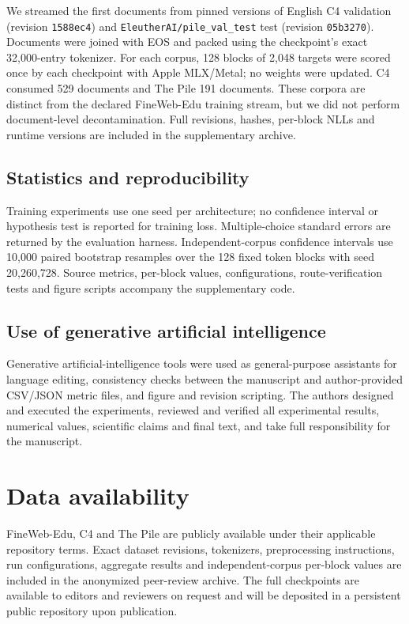 \documentclass[11pt]{article}
\begin{document}
We streamed the first documents from pinned versions of English C4 validation (revision \texttt{1588ec4}) and \texttt{EleutherAI/pile\_val\_test} test (revision \texttt{05b3270}). Documents were joined with EOS and packed using the checkpoint's exact 32,000-entry tokenizer. For each corpus, 128 blocks of 2,048 targets were scored once by each checkpoint with Apple MLX/Metal; no weights were updated. C4 consumed 529 documents and The Pile 191 documents. These corpora are distinct from the declared FineWeb-Edu training stream, but we did not perform document-level decontamination. Full revisions, hashes, per-block NLLs and runtime versions are included in the supplementary archive.

\subsection*{Statistics and reproducibility}

Training experiments use one seed per architecture; no confidence interval or hypothesis test is reported for training loss. Multiple-choice standard errors are returned by the evaluation harness. Independent-corpus confidence intervals use 10,000 paired bootstrap resamples over the 128 fixed token blocks with seed 20,260,728. Source metrics, per-block values, configurations, route-verification tests and figure scripts accompany the supplementary code.

\subsection*{Use of generative artificial intelligence}

Generative artificial-intelligence tools were used as general-purpose assistants for language editing, consistency checks between the manuscript and author-provided CSV/JSON metric files, and figure and revision scripting. The authors designed and executed the experiments, reviewed and verified all experimental results, numerical values, scientific claims and final text, and take full responsibility for the manuscript.

\section*{Data availability}

FineWeb-Edu, C4 and The Pile are publicly available under their applicable repository terms. Exact dataset revisions, tokenizers, preprocessing instructions, run configurations, aggregate results and independent-corpus per-block values are included in the anonymized peer-review archive. The full checkpoints are available to editors and reviewers on request and will be deposited in a persistent public repository upon publication.
\end{document}
